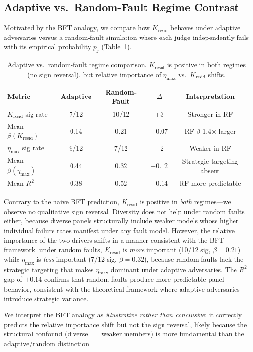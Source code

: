 \documentclass[11pt,a4paper]{article}
\newcommand{\etamax}{\eta_{\max}}
\newcommand{\kresid}{K_{\text{resid}}}
\begin{document}
\subsection{Adaptive vs.\ Random-Fault Regime Contrast}

Motivated by the BFT analogy, we compare how $\kresid$ behaves under adaptive adversaries versus a random-fault simulation where each judge independently fails with its empirical probability $p_j$ (Table~\ref{tab:bft_contrast}).

\begin{table}[t]
\centering
\caption{Adaptive vs.\ random-fault regime comparison. $\kresid$ is positive in both regimes (no sign reversal), but relative importance of $\etamax$ vs.\ $\kresid$ shifts.}
\label{tab:bft_contrast}
\small
\begin{tabular}{@{}lcccc@{}}
\toprule
Metric & Adaptive & Random-Fault & $\Delta$ & Interpretation \\
\midrule
$\kresid$ sig rate & 7/12 & 10/12 & +3 & Stronger in RF \\
Mean $\beta(\kresid)$ & 0.14 & 0.21 & +0.07 & RF $\beta$ 1.4$\times$ larger \\
$\etamax$ sig rate & 9/12 & 7/12 & $-2$ & Weaker in RF \\
Mean $\beta(\etamax)$ & 0.44 & 0.32 & $-0.12$ & Strategic targeting absent \\
Mean $R^2$ & 0.38 & 0.52 & +0.14 & RF more predictable \\
\bottomrule
\end{tabular}
\end{table}

Contrary to the naive BFT prediction, $\kresid$ is positive in \emph{both} regimes---we observe no qualitative sign reversal. Diversity does not help under random faults either, because diverse panels structurally include weaker models whose higher individual failure rates manifest under any fault model. However, the relative importance of the two drivers shifts in a manner consistent with the BFT framework: under random faults, $\kresid$ is \emph{more} important (10/12 sig, $\beta = 0.21$) while $\etamax$ is \emph{less} important (7/12 sig, $\beta = 0.32$), because random faults lack the strategic targeting that makes $\etamax$ dominant under adaptive adversaries. The $R^2$ gap of $+0.14$ confirms that random faults produce more predictable panel behavior, consistent with the theoretical framework where adaptive adversaries introduce strategic variance.

We interpret the BFT analogy as \emph{illustrative rather than conclusive}: it correctly predicts the relative importance shift but not the sign reversal, likely because the structural confound (diverse $=$ weaker members) is more fundamental than the adaptive/random distinction.
\end{document}
